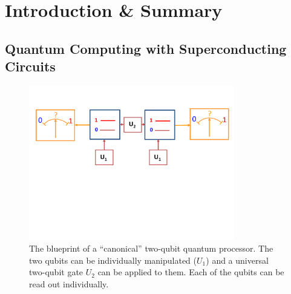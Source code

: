 \chapter{Introduction \& Summary}


\section{Quantum Computing with Superconducting Circuits} \label{section:divincenzo_criteria}

%
\begin{figure}
\centering \includegraphics[width=0.8\textwidth]{./material/papers/grover/submission1/Fig1}
\caption[Blueprint of a {}``canonical'' two-qubit quantum processor]{The blueprint of a {}``canonical'' two-qubit quantum processor.
The two qubits can be individually manipulated ($U_{1}$) and
a universal two-qubit gate $U_{2}$ can be applied to them. Each of
the qubits can be read out individually.}


\label{fig:qubit_processor_blueprint} %
\end{figure}


